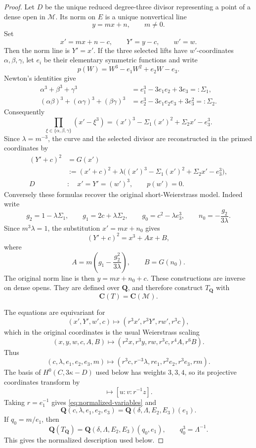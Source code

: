 \documentclass[10pt]{amsart}
\numberwithin{equation}{section}
\theoremstyle{definition}
\theoremstyle{remark}
\newcommand{\CC}{\mathbf C}
\newcommand{\QQ}{\mathbf Q}
\newcommand{\cM}{\mathcal M}
\begin{document}
\begin{proof}
Let $D$ be the unique reduced degree-three divisor representing a point of a
dense open in $\cM$.  Its norm on $E$ is a unique nonvertical line
\[
 y=mx+n,
 \qquad m\ne0.
\]
Set
\[
 x'=mx+n-c,
 \qquad
 Y'=y-c,
 \qquad
 w'=w.
\]
Then the norm line is $Y'=x'$.  If the three selected lifts have
$w'$-coordinates $\alpha,\beta,\gamma$, let $e_i$ be their elementary
symmetric functions and write
\[
 p(W)=W^3-e_1W^2+e_2W-e_3.
\]
Newton's identities give
\[
 \begin{aligned}
 \alpha^3+\beta^3+\gamma^3
   &=e_1^3-3e_1e_2+3e_3=: \Sigma_1,\\
 (\alpha\beta)^3+(\alpha\gamma)^3+(\beta\gamma)^3
   &=e_2^3-3e_1e_2e_3+3e_3^2=: \Sigma_2.
 \end{aligned}
\]
Consequently
\[
 \prod_{\xi\in\{\alpha,\beta,\gamma\}}(x'-\xi^3)
 =(x')^3-\Sigma_1(x')^2+\Sigma_2x'-e_3^3.
\]
Since $\lambda=m^{-3}$, the curve and the selected divisor are reconstructed
in the primed coordinates by
\begin{equation}
 \begin{aligned}
 (Y'+c)^2
   &=G(x')\\
   &:=(x'+c)^2+\lambda\bigl((x')^3-\Sigma_1(x')^2
                  +\Sigma_2x'-e_3^3\bigr),\\
 D&:\quad x'=Y'=(w')^3,\qquad p(w')=0.
 \end{aligned}
\label{eq:chart-curve-divisor}
\end{equation}
Conversely these formulas recover the original short-Weierstrass model.
Indeed write
\[
 g_2=1-\lambda\Sigma_1,
 \qquad
 g_1=2c+\lambda\Sigma_2,
 \qquad
 g_0=c^2-\lambda e_3^3,
 \qquad
 n_0=-\frac{g_2}{3\lambda}.
\]
Since $m^3\lambda=1$, the substitution $x'=mx+n_0$ gives
\[
 (Y'+c)^2=x^3+Ax+B,
\]
where
\[
 A=m\left(g_1-\frac{g_2^2}{3\lambda}\right),
 \qquad
 B=G(n_0).
\]
The original norm line is then $y=mx+n_0+c$.  These constructions are
inverse on dense opens.  They are defined over $\QQ$, and therefore
construct $T_{\QQ}$ with
\begin{equation}
 \CC(T)=\CC(\cM).
\label{eq:chart-function-field}
\end{equation}

The equations are equivariant for
\[
 (x',Y',w',c)\longmapsto(r^3x',r^3Y',rw',r^3c),
\]
which in the original coordinates is the usual Weierstrass scaling
\[
 (x,y,w,c,A,B)
 \longmapsto
 (r^2x,r^3y,rw,r^3c,r^4A,r^6B).
\]
Thus
\[
 (c,\lambda,e_1,e_2,e_3,m)
 \longmapsto
 (r^3c,r^{-3}\lambda,re_1,r^2e_2,r^3e_3,rm).
\]
The basis of $H^0(C,3\kappa-D)$ used below has weights $3,3,4$, so its
projective coordinates transform by
\begin{equation}
 [u:v:z]\longmapsto[u:v:r^{-1}z].
\label{eq:section-scaling}
\end{equation}
Taking $r=e_1^{-1}$ gives \eqref{eq:normalized-variables} and
\[
 \QQ(c,\lambda,e_1,e_2,e_3)
 =\QQ(\delta,\Lambda,E_2,E_3)(e_1).
\]
If $q_0=m/e_1$, then
\begin{equation}
 \QQ(T_{\QQ})
 =\QQ(\delta,\Lambda,E_2,E_3)(q_0,e_1),
 \qquad q_0^3=\Lambda^{-1}.
\label{eq:cubic-chart-field}
\end{equation}
This gives the normalized description used below.
\end{proof}
\end{document}
